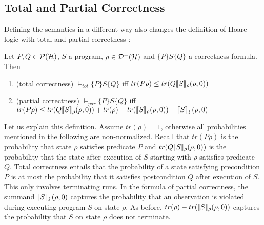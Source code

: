 \documentclass[a4paper,UKenglish,cleveref, autoref, thm-restate]{lipics-v2021}
\begin{document}
\subsection{Total and Partial Correctness}
Defining the semantics in a different way also changes the definition of Hoare logic with total and partial correctness \cite{floydHoareLogic}:
\begin{definition}
    Let $P,Q\in \mathcal{P}(\mathcal{H})$, $S$ a program, $\rho\in \mathcal{D}^- (\mathcal{H})$ and $\{P\} S \{Q\}$ a correctness formula. Then
    \begin{enumerate}
        \item (total correctness) $\models_{tot} \{P\} S \{Q\}$ iff $tr(P\rho)\leq tr(Q\llbracket S  \rrbracket_{\rho} (\rho,0))$
        \item (partial correctness) $\models_{par} \{P\} S \{Q\}$ iff $tr(P\rho)\leq tr(Q\llbracket S  \rrbracket_{\rho} (\rho,0))+ tr(\rho)- tr(\llbracket S  \rrbracket_{\rho} (\rho,0)) - \llbracket S  \rrbracket_{\lightning} (\rho,0)$
    \end{enumerate}
\end{definition}
Let us explain this definition. Assume $tr(\rho)=1$, otherwise all probabilities mentioned in the following are non-normalized.
Recall that $tr(P\rho)$ is the probability that state $\rho$ satisfies predicate $P$ and $tr(Q\llbracket S  \rrbracket_{\rho} (\rho,0))$ is the probability that the state after execution of $S$ starting with $\rho$ satisfies predicate $Q$. Total correctness entails that the probability of a state satisfying precondition $P$ is at most the probability that it satisfies postcondition $Q$ after execution of $S$. This only involves terminating runs.
In the formula of partial correctness, the summand $\llbracket S  \rrbracket_{\lightning} (\rho,0)$ captures the probability that an observation is violated during executing program $S$ on state $\rho$. As before, $tr(\rho)- tr(\llbracket S  \rrbracket_{\rho} (\rho,0))$ captures the probability that $S$ on state $\rho$ does not terminate.
\end{document}
